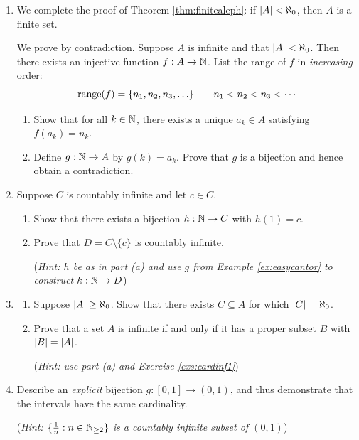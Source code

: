 \begin{exercises}{}{}
\begin{enumerate}
		
		\item\label{exs:finitealephproof} We complete the proof of Theorem \ref{thm:finitealeph}: if $\left| A\right|<\aleph_0$, then $A$ is a finite set.\par
		We prove by contradiction. Suppose $A$ is infinite and that $\left| A\right|<\aleph_0$. Then there exists an injective function $f:A\to\mathbb{N}$. List the range of $f$ in \emph{increasing} order:
		\[
		  \operatorname{range}(f)=\{n_1,n_2,n_3,\ldots\}\qquad n_1<n_2<n_3<\cdots
		\]
		\begin{enumerate}
		  \item Show that for all $k\in\mathbb{N}$, there exists a unique $a_k\in A$ satisfying $f(a_k)=n_k$.
		  \item Define $g:\mathbb{N}\to A$ by $g(k)=a_k$. Prove that $g$ is a bijection and hence obtain a contradiction.
		\end{enumerate}
	
		
		\item\label{exs:cardinf1} Suppose $C$ is countably infinite and let $c\in C$.
		\begin{enumerate}
			\item Show that there exists a bijection $h:\mathbb{N}\to C$ with $h(1)=c$.
		  \item Prove that $D=C\setminus\{c\}$ is countably infinite.\par
			(\emph{Hint: $h$ be as in part (a) and use $g$ from Example \ref{ex:easycantor} to construct $k:\mathbb{N}\to D$})
		\end{enumerate}
		
		
		\item\label{exs:cardinf2}
		\begin{enumerate}
		  \item Suppose $\left| A\right|\ge\aleph_0$. Show that there exists $C\subseteq A$ for which $\left| C\right|=\aleph_0$.
		  \item Prove that a set $A$ is infinite if and only if it has a proper subset $B$ with $\left| B\right|=\left| A\right|$.\par
		  (\emph{Hint: use part (a) and Exercise \ref{exs:cardinf1}})
		\end{enumerate}
		
		\item\label{exs:openclosedcard} Describe an \emph{explicit} bijection $g:[0,1]\to (0,1)$, and thus demonstrate that the intervals have the same cardinality.\par
		(\emph{Hint: $\{\frac 1n:n\in \mathbb{N}_{\ge 2}\}$ is a countably infinite subset of $(0,1)$})
		
	\end{enumerate}

\end{exercises}

